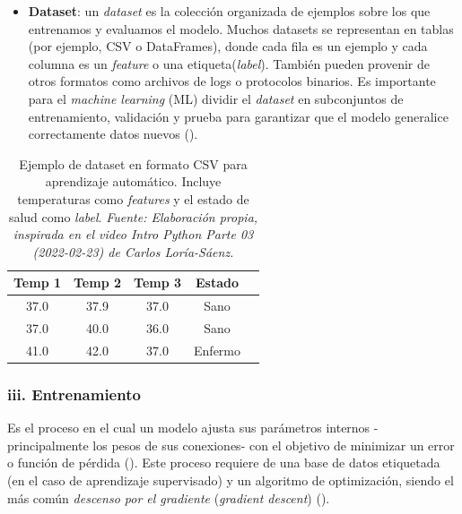 \documentclass[11pt]{article} %
\begin{document}
\begin{itemize}
    \item \textbf{Dataset}: un \textit{dataset} es la colección organizada de ejemplos sobre los que entrenamos y evaluamos el modelo. Muchos datasets se representan en tablas (por ejemplo, CSV o DataFrames), donde cada fila es un ejemplo y cada columna es un \textit{feature} o una etiqueta(\textit{label}). También pueden provenir de otros formatos como archivos de logs o protocolos binarios. Es importante para el \textit{machine learning} (ML) dividir el \textit{dataset} en subconjuntos de entrenamiento, validación y prueba para garantizar que el modelo generalice correctamente datos nuevos (\cite{googleML2025}).
\end{itemize}

\begin{table}[h]
\centering
\caption{Ejemplo de dataset en formato CSV para aprendizaje automático. Incluye temperaturas como \textit{features} y el estado de salud como \textit{label}. \textit{Fuente: Elaboración propia, inspirada en el video \textit{Intro Python Parte 03 (2022-02-23)} de Carlos Loría-Sáenz.}}

\label{tab:ml_dataset_example}
\begin{tabular}{|c|c|c|c|c|}
\hline
\textbf{Temp 1} & \textbf{Temp 2} & \textbf{Temp 3} & \textbf{Estado} \\
\hline
37.0 & 37.9 & 37.0 & Sano \\
37.0 & 40.0 & 36.0 & Sano \\
41.0 & 42.0 & 37.0 & Enfermo \\
\hline
\end{tabular}
\end{table}
\vspace{8pt}
\subsubsection{iii. Entrenamiento}
Es el proceso en el cual un modelo ajusta sus parámetros internos -principalmente los pesos de sus conexiones- con el objetivo de minimizar un error o función de pérdida (\cite{nvidia}). Este proceso requiere de una base de datos etiquetada (en el caso de aprendizaje supervisado) y un algoritmo de optimización, siendo el más común \textit{descenso por el gradiente} (\textit{gradient descent}) (\cite{sanchez}).
\end{document}
